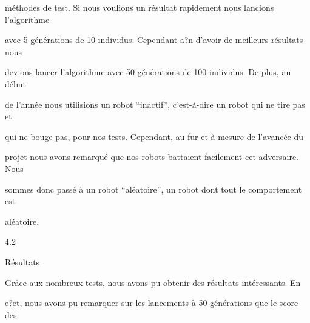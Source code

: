 \documentclass[a4paper,portrait,12pt]{article}
\begin{document}
\begin{flushleft}
m\'{e}thodes de test. Si nous voulions un r\'{e}sultat rapidement nous lancions l'algorithme
\end{flushleft}


\begin{flushleft}
avec 5 g\'{e}n\'{e}rations de 10 individus. Cependant a?n d'avoir de meilleurs r\'{e}sultats nous
\end{flushleft}


\begin{flushleft}
devions lancer l'algorithme avec 50 g\'{e}n\'{e}rations de 100 individus. De plus, au d\'{e}but
\end{flushleft}


\begin{flushleft}
de l'ann\'{e}e nous utilisions un robot {``}inactif'', c'est-\`{a}-dire un robot qui ne tire pas et
\end{flushleft}


\begin{flushleft}
qui ne bouge pas, pour nos tests. Cependant, au fur et \`{a} mesure de l'avanc\'{e}e du
\end{flushleft}


\begin{flushleft}
projet nous avons remarqu\'{e} que nos robots battaient facilement cet adversaire. Nous
\end{flushleft}


\begin{flushleft}
sommes donc pass\'{e} \`{a} un robot {``}al\'{e}atoire'', un robot dont tout le comportement est
\end{flushleft}


\begin{flushleft}
al\'{e}atoire.
\end{flushleft}


4.2





\begin{flushleft}
R\'{e}sultats
\end{flushleft}





\begin{flushleft}
Gr\^{a}ce aux nombreux tests, nous avons pu obtenir des r\'{e}sultats int\'{e}ressants. En
\end{flushleft}


\begin{flushleft}
e?et, nous avons pu remarquer sur les lancements \`{a} 50 g\'{e}n\'{e}rations que le score des
\end{flushleft}
\end{document}
